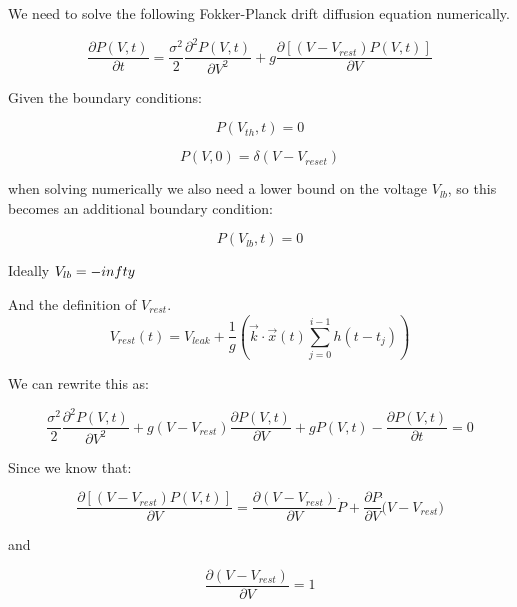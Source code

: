 \documentclass[10pt]{article}
\begin{document}
We need to solve the following Fokker-Planck drift diffusion equation
numerically.

\begin{equation}
    \frac{\partial P(V,t)}{\partial t} =
    \frac{\sigma^2}{2} \frac{\partial^2 P(V,t) } {\partial V^2} +
    g\frac{\partial[(V-V_{rest})P(V,t)]}{\partial V}
\end{equation}

Given the boundary conditions:
 
\begin{equation}
    P(V_{th},t) = 0
\end{equation}

\begin{equation}
    P(V,0) = \delta(V-V_{reset})
\end{equation}

when solving numerically we also need a lower bound on the
voltage $V_{lb}$, so this becomes an additional boundary condition:

\begin{equation}
    P(V_{lb},t) = 0 
\end{equation}

Ideally $V_{lb} = -\\infty $

And the definition of $V_{rest}$.
\begin{equation}
    V_{rest}(t) = V_{leak} + \frac{1}{g}(\vec{k} \cdot \vec{x}(t)
    \sum_{j=0}^{i-1}h(t-t_j))
\end{equation}


We can rewrite this as:

\begin{equation}
    \frac{\sigma^2}{2} \frac{\partial^2 P(V,t) } {\partial V^2} +
    g(V-V_{rest})\frac{\partial P(V,t)}{\partial V} +
    gP(V,t) -
    \frac{\partial P(V,t)}{\partial t} = 
    0
\end{equation}

Since we know that:

\begin{equation}
    \frac{\partial[(V-V_{rest})P(V,t)]}{\partial V} =
    \frac{\partial (V-V_{rest})}{\partial V} \dot P +
    \frac{\partial P}{\partial V} \dot (V-V_{rest})
\end{equation}

and

\begin{equation}
    \frac{\partial (V-V_{rest})}{\partial V} = 1
\end{equation}
\end{document}
